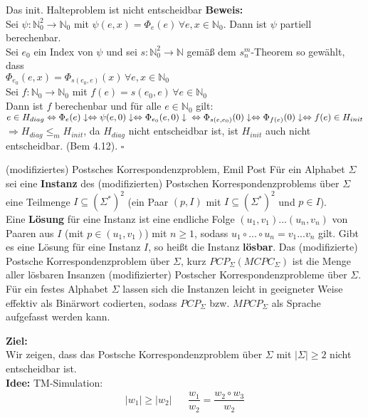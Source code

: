 \begin{satz}{Das init. Halteproblem ist nicht entscheidbar}
    \textbf{Beweis:}\\
    Sei $\psi : \mathbb{N}_0^2 \rightarrow \mathbb{N}_0$ mit $\psi(e,x) = \Phi_e(e) \, \forall e,x \in \mathbb{N}_0$. Dann ist $\psi$ partiell berechenbar. \\
    Sei $e_0$ ein Index von $\psi$ und sei $s:\mathbb{N}_0^2 \rightarrow \mathbb{N}$ gemäß dem $s^m_n$-Theorem so gewählt, 
    dass \\ $\Phi_{e_0}(e,x) = \Phi_{s(e_0,e)}(x) \, \forall e,x \in \mathbb{N}_0$ \\
    Sei $f: \mathbb{N}_0 \rightarrow \mathbb{N}_0$ mit $f(e) = s(e_0,e) \, \forall e\in \mathbb{N}_0$ \\

    Dann ist $f$ berechenbar und für alle $e \in \mathbb{N}_0$ gilt:\\
    $e \in H_{diag} \Leftrightarrow \Phi_e(e)\downarrow \Leftrightarrow \psi(e,0)\downarrow \Leftrightarrow \Phi_{e_0}(e,0)\downarrow \\
    \Leftrightarrow \Phi_{s(e,e_0)}(0)\downarrow \Leftrightarrow \Phi_{f(e)}(0)\downarrow \Leftrightarrow f(e) \in H_{init}$ \\

    $\Rightarrow H_{diag} \leq_m H_{init}$, da $H_{diag}$ nicht entscheidbar ist, ist $H_{init}$ auch nicht entscheidbar. (Bem 4.12). $\square$
\end{satz}

\begin{defn}{(modifiziertes) Postsches Korrespondenzproblem, Emil Post}
    Für ein Alphabet $\Sigma$ sei eine \textbf{Instanz} des (modifizierten) Postschen Korrespondenzproblems über $\Sigma$ eine Teilmenge $I \subseteq (\Sigma^*)^2$ 
    (ein Paar $(p, I)$ mit $I \subseteq (\Sigma^*)^2$ und $p \in I$). \\

    Eine \textbf{Lösung} für eine Instanz ist eine endliche Folge $(u_1,v_1)...(u_n,v_n)$ von Paaren aus $I$ (mit $p \in (u_1,v_1)$) mit $n \geq 1$, sodass
    $u_1 \circ ... \circ u_n = v_1...v_n$ gilt. Gibt es eine Lösung für eine Instanz $I$, so heißt die Instanz \textbf{lösbar}. Das (modifizierte) Postsche 
    Korrespondenzproblem über $\Sigma$, kurz $PCP_\Sigma (MCPC_\Sigma)$ ist die Menge aller lösbaren Insanzen (modifizierter) Postscher Korrespondenzprobleme 
    über $\Sigma$. \\

    Für ein festes Alphabet $\Sigma$ lassen sich die Instanzen leicht in geeigneter Weise effektiv als Binärwort codierten, sodass $PCP_\Sigma$ bzw. $MPCP_\Sigma$ 
    als Sprache aufgefasst werden kann.
\end{defn}

\textbf{Ziel:} \\
Wir zeigen, dass das Postsche Korrespondenzproblem über $\Sigma$ mit $|\Sigma| \geq 2$ nicht entscheidbar ist. \\

\textbf{Idee:} TM-Simulation: \\
\begin{align*}
    |w_1| \geq |w_2| && \dfrac{w_1}{w_2} = \dfrac{w_2 \circ w_3}{w_2} \\
\end{align*}